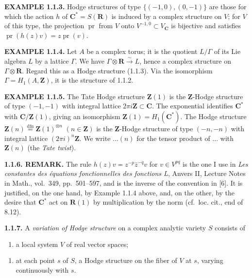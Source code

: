 \documentclass[10pt,a4paper]{article}
\providecommand{\tightlist}{\setlength{\itemsep}{0pt}\setlength{\parskip}{0pt}}
\newcommand{\SourcePage}[2]{\clearpage\setcounter{page}{#2}\typeout{D031_SOURCE_PAGE physical=#1 printed=#2}}
\begin{document}
\textbf{EXAMPLE 1.1.3.} Hodge structures of type \(\{(-1,0),(0,-1)\}\) are those for which the action \(h\) of \(\mathbf C^*=S(\mathbf R)\) is induced by a complex structure on \(V\); for \(V\) of this type, the projection \(\operatorname{pr}\) from \(V\) onto \(V^{-1,0}\subset V_{\mathbf C}\) is bijective and satisfies \(\operatorname{pr}(h(z)v)=z\operatorname{pr}(v)\).

\textbf{EXAMPLE 1.1.4.} Let \(A\) be a complex torus; it is the quotient \(L/\Gamma\) of its Lie algebra \(L\) by a lattice \(\Gamma\). We have \(\Gamma\otimes\mathbf R\xrightarrow{\sim}L\), hence a complex structure on \(\Gamma\otimes\mathbf R\). Regard this as a Hodge structure (1.1.3). Via the isomorphism \(\Gamma=H_1(A,\mathbf Z)\), it is the structure of 1.1.2.

\textbf{EXAMPLE 1.1.5.} The Tate Hodge structure \(\mathbf Z(1)\) is the \(\mathbf Z\)-Hodge structure of type \((-1,-1)\) with integral lattice \(2\pi i\mathbf Z\subset\mathbf C\). The exponential identifies \(\mathbf C^*\) with \(\mathbf C/\mathbf Z(1)\), giving an isomorphism \(\mathbf Z(1)=H_1(\mathbf C^*)\). The Hodge structure \(\mathbf Z(n)\stackrel{\mathrm{dfn}}{=}\mathbf Z(1)^{\otimes n}\) \((n\in\mathbf Z)\) is the \(\mathbf Z\)-Hodge structure of type \((-n,-n)\) with integral lattice \((2\pi i)^n\mathbf Z\). We write \(\ldots(n)\) for the tensor product of \(\ldots\) with \(\mathbf Z(n)\) (the \emph{Tate twist}).

\textbf{1.1.6. REMARK.} The rule \(h(z)v=z^{-p}\bar z^{-q}v\) for \(v\in V^{pq}\) is the one I use in \emph{Les constantes des équations fonctionnelles des fonctions L}, Anvers II, Lecture Notes in Math., vol.~349, pp.~501--597, and is the inverse of the convention in {[}6{]}. It is justified, on the one hand, by Example 1.1.4 above, and, on the other, by the desire that \(\mathbf C^*\) act on \(\mathbf R(1)\) by multiplication by the norm (cf.~loc. cit., end of 8.12).

\textbf{1.1.7.} A \emph{variation of Hodge structure} on a complex analytic variety \(S\) consists of

\begin{enumerate}
\def\labelenumi{(\alph{enumi})}
\tightlist
\item
  a local system \(V\) of real vector spaces;
\end{enumerate}

\SourcePage{7}{253}
\begin{enumerate}
\def\labelenumi{(\alph{enumi})}
\setcounter{enumi}{1}
\tightlist
\item
  at each point \(s\) of \(S\), a Hodge structure on the fiber of \(V\) at \(s\), varying continuously with \(s\).
\end{enumerate}
\end{document}
